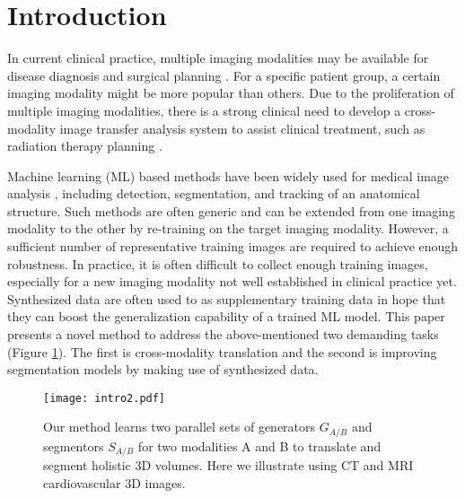 \documentclass[10pt,twocolumn,letterpaper]{article}
\begin{document}
\vspace{-.2cm}
\section{Introduction}
In current clinical practice, multiple imaging modalities may be available for disease diagnosis and surgical planning \cite{cao2017dual}.
For a specific patient group, a certain imaging modality might be more popular than others.
Due to the proliferation of multiple imaging modalities, there is a strong clinical need to develop a cross-modality image transfer analysis system to assist clinical treatment, such as radiation therapy planning \cite{burgos2015robust}. 

Machine learning (ML) based methods have been widely used for medical image analysis \cite{Zhang_2017_CVPR,Zhang2017TandemNet}, including detection, segmentation, and tracking of an anatomical structure.
Such methods are often generic and can be extended from one imaging modality to the other by re-training on the target imaging modality.
However, a sufficient number of representative training images are required to achieve enough robustness.
In practice, it is often difficult to collect enough training images, especially for a new imaging modality not well established in clinical practice yet. 
Synthesized data are often used to as supplementary training data in hope that they can boost the generalization capability of a trained ML model.
This paper presents a novel method to address the above-mentioned two demanding tasks (Figure \ref{fig:intro}). The first is cross-modality translation and the second is improving segmentation models by making use of synthesized data. 


\begin{figure}[t]
	\begin{center}
		\texttt{[image: intro2.pdf]}
	\end{center}
	\vspace{-.4cm}
	\caption{Our method learns two parallel sets of generators $G_{A/B}$  and segmentors $S_{A/B}$ for two modalities A and B to translate and segment holistic 3D volumes. Here we illustrate using CT and MRI cardiovascular 3D images.} \label{fig:intro} \vspace{-.2cm}
\end{figure}
\end{document}
